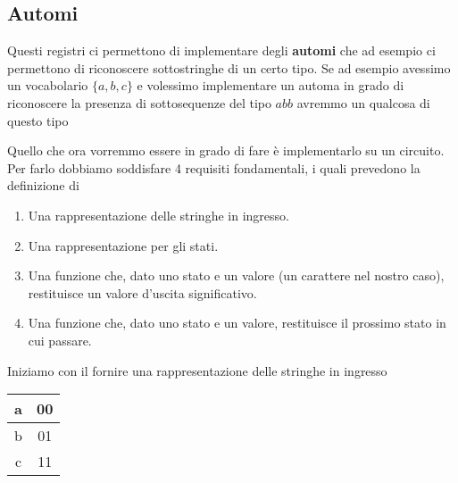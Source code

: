 \subsection{Automi}
Questi registri ci permettono di implementare degli \textbf{automi} che ad esempio ci permettono
di riconoscere sottostringhe di un certo tipo. Se ad esempio avessimo un vocabolario $\{a, b, c\}$
e volessimo implementare un automa in grado di riconoscere la presenza di sottosequenze del tipo
$abb$ avremmo un qualcosa di questo tipo
\begin{center}
\end{center}
Quello che ora vorremmo essere in grado di fare è implementarlo su un circuito. Per farlo dobbiamo
soddisfare 4 requisiti fondamentali, i quali prevedono la definizione di
\begin{enumerate}
	\item Una rappresentazione delle stringhe in ingresso.
	\item Una rappresentazione per gli stati.
	\item Una funzione che, dato uno stato e un valore (un carattere nel nostro caso), restituisce
	      un valore d'uscita significativo.
	\item Una funzione che, dato uno stato e un valore, restituisce il prossimo stato in cui
	      passare.
\end{enumerate}
Iniziamo con il fornire una rappresentazione delle stringhe in ingresso
\begin{center}
	\begin{tabular}{c | c}
		a & 00 \\ \hline
		b & 01 \\ \hline
		c & 11
	\end{tabular}
\end{center}

